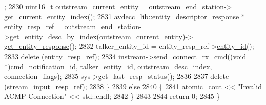 \begin{DoxyCode}
      ;
2830         uint16\_t outstream\_current\_entity = outstream\_end\_station->
      \hyperlink{classavdecc__lib_1_1end__station_aaf7e2defcfdf88c62c04fd88bd49787d}{get\_current\_entity\_index}();
2831         \hyperlink{classavdecc__lib_1_1entity__descriptor__response}{avdecc\_lib::entity\_descriptor\_response} * entity\_resp\_ref = 
      outstream\_end\_station->\hyperlink{classavdecc__lib_1_1end__station_a7456434346294f611e4d37255be4051b}{get\_entity\_desc\_by\_index}(outstream\_current\_entity)->
      \hyperlink{classavdecc__lib_1_1entity__descriptor_ac31dd117f0c931ae93c8ba52df7211bd}{get\_entity\_response}();
2832         talker\_entity\_id = entity\_resp\_ref->\hyperlink{classavdecc__lib_1_1entity__descriptor__response_a3374e7e9d63f8e1756480b16df9bc0c0}{entity\_id}();
2833         \textcolor{keyword}{delete} (entity\_resp\_ref);
2834         instream->\hyperlink{classavdecc__lib_1_1stream__input__descriptor_ac2512dd4aa0d7f0d917b61352294460f}{send\_connect\_rx\_cmd}((\textcolor{keywordtype}{void} *)cmd\_notification\_id, talker\_entity\_id, 
      outstream\_desc\_index, connection\_flags);
2835         \hyperlink{classcmd__line_a485db4800e331cb4052c447fdf5d154e}{sys}->\hyperlink{classavdecc__lib_1_1system_aa63e8d1a4e51f695cdcccc9340922407}{get\_last\_resp\_status}();
2836 
2837         \textcolor{keyword}{delete} (stream\_input\_resp\_ref);
2838     \}
2839     \textcolor{keywordflow}{else}
2840     \{
2841         \hyperlink{cmd__line_8h_a0bc38ccc65c79ba06c6fcd7b4bf554c3}{atomic\_cout} << \textcolor{stringliteral}{"Invalid ACMP Connection"} << std::endl;
2842     \}
2843 
2844     \textcolor{keywordflow}{return} 0;
2845 \}
\end{DoxyCode}


